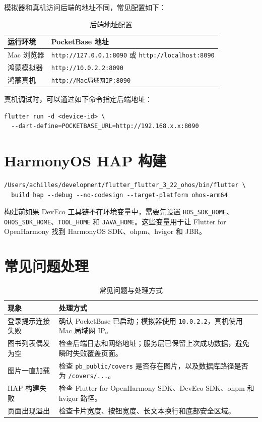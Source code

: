 模拟器和真机访问后端的地址不同，常见配置如下：

\begin{table}[htbp]
\centering
\caption{后端地址配置}
\label{tab:backend-url-config}
\begin{tabularx}{0.95\textwidth}{l>{\RaggedRight\arraybackslash}X}
\toprule
\textbf{运行环境} & \textbf{PocketBase 地址} \\
\midrule
Mac 浏览器 & \texttt{http://127.0.0.1:8090} 或 \texttt{http://localhost:8090} \\
鸿蒙模拟器 & \texttt{http://10.0.2.2:8090} \\
鸿蒙真机 & \texttt{http://Mac局域网IP:8090} \\
\bottomrule
\end{tabularx}
\end{table}

真机调试时，可以通过如下命令指定后端地址：

\begin{lstlisting}[style=codexcode]
flutter run -d <device-id> \
  --dart-define=POCKETBASE_URL=http://192.168.x.x:8090
\end{lstlisting}

\section{HarmonyOS HAP 构建}

\begin{lstlisting}[style=codexcode]
/Users/achilles/development/flutter_flutter_3_22_ohos/bin/flutter \
  build hap --debug --no-codesign --target-platform ohos-arm64
\end{lstlisting}

构建前如果 DevEco 工具链不在环境变量中，需要先设置 \texttt{HOS\_SDK\_HOME}、\texttt{OHOS\_SDK\_HOME}、\texttt{TOOL\_HOME} 和 \texttt{JAVA\_HOME}。这些变量用于让 Flutter for OpenHarmony 找到 HarmonyOS SDK、ohpm、hvigor 和 JBR。

\section{常见问题处理}

\begin{table}[htbp]
\centering
\caption{常见问题与处理方式}
\label{tab:faq}
\begin{tabularx}{0.95\textwidth}{l>{\RaggedRight\arraybackslash}X}
\toprule
\textbf{现象} & \textbf{处理方式} \\
\midrule
登录提示连接失败 & 确认 PocketBase 已启动；模拟器使用 \texttt{10.0.2.2}，真机使用 Mac 局域网 IP。 \\
图书列表偶发为空 & 检查后端日志和网络地址；服务层已保留上次成功数据，避免瞬时失败覆盖页面。 \\
图片一直加载 & 检查 \texttt{pb\_public/covers} 是否存在图片，以及数据库路径是否为 \texttt{/covers/...}。 \\
HAP 构建失败 & 检查 Flutter for OpenHarmony SDK、DevEco SDK、ohpm 和 hvigor 路径。 \\
页面出现溢出 & 检查卡片宽度、按钮宽度、长文本换行和底部安全区域。 \\
\bottomrule
\end{tabularx}
\end{table}

